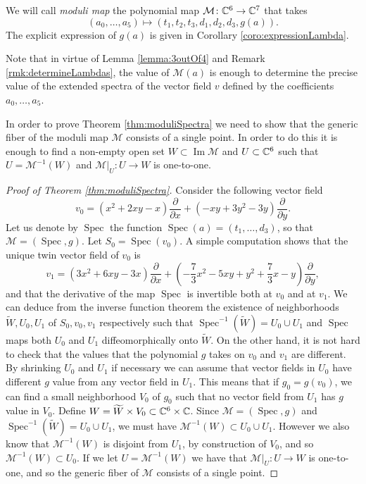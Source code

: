 \documentclass[phd,tocprelim]{cornell}
\begin{document}
\begin{definition}\label{def:moduliMap}
We will call \textit{moduli map} the polynomial map $\mathcal{M}\colon\mathbb{C}^6\to\mathbb{C}^7$ that takes 
\[ (a_0,\ldots,a_5)\longmapsto (t_1,t_2,t_3,d_1,d_2,d_3,g(a)).  \]
The explicit expression of $g(a)$ is given in Corollary \ref{coro:expressionLambda}.
\end{definition}

Note that in virtue of Lemma \ref{lemma:3outOf4} and Remark \ref{rmk:determineLambdas}, the value of $\mathcal{M}(a)$ is enough to determine the precise value of the extended spectra of the vector field $v$ defined by the coefficients $a_0,\ldots,a_5$.

In order to prove Theorem \ref{thm:moduliSpectra} we need to show that the generic fiber of the moduli map $\mathcal{M}$ consists of a single point. In order to do this it is enough to find a non-empty open set $W\subset\operatorname{Im }\mathcal{M}$ and $U\subset\mathbb{C}^6$ such that $U=\mathcal{M}^{-1}(W)$ and $\mathcal{M}\vert_{U}\colon U\to W$ is one-to-one.

\begin{proof}[Proof of Theorem \ref*{thm:moduliSpectra}]
Consider the following vector field
\[ v_0 = (x^2+2xy-x)\frac{\partial}{\partial x}+(-xy+3y^2-3y)\frac{\partial}{\partial y}. \]
Let us denote by $\operatorname{Spec}$ the function $\operatorname{Spec}(a)=(t_1,\ldots,d_3)$, so that $\mathcal{M}=(\operatorname{Spec},g)$. Let $S_0=\operatorname{Spec}(v_0)$. A simple computation shows that the unique twin vector field of $v_0$ is
\[ v_1 = (3x^2+6xy-3x)\frac{\partial}{\partial x}+\left(-\frac{7}{3}x^2-5xy+y^2+\frac{7}{3}x-y\right)\frac{\partial}{\partial y}, \]
and that the derivative of the map $\operatorname{Spec}$ is invertible both at $v_0$ and at $v_1$. We can deduce from the inverse function theorem the existence of neighborhoods $\widetilde{W}, U_0, U_1$ of $S_0,v_0,v_1$ respectively such that $\operatorname{Spec}^{-1}(\widetilde{W})= U_0\cup U_1$ and $\operatorname{Spec}$ maps both $ U_0$ and $ U_1$ diffeomorphically onto $\widetilde{W}$. On the other hand, it is not hard to check that the values that the polynomial $g$ takes on $v_0$ and $v_1$ are different. By shrinking $ U_0$ and $ U_1$ if necessary we can assume that vector fields in $ U_0$ have different $g$ value from any vector field in $ U_1$. This means that if $g_0=g(v_0)$, we can find a small neighborhood $V_0$ of $g_0$ such that no vector field from $ U_1$ has $g$ value in $V_0$. Define $W=\widetilde{W}\times V_0\subset\mathbb{C}^6\times\mathbb{C}$. Since $\mathcal{M}=(\operatorname{Spec},g)$ and $\operatorname{Spec}^{-1}(\widetilde{W})= U_0\cup U_1$, we must have $\mathcal{M}^{-1}(W)\subset  U_0\cup U_1$. However we also know that $\mathcal{M}^{-1}(W)$ is disjoint from $ U_1$, by construction of $V_0$, and so $\mathcal{M}^{-1}(W)\subset U_0$. If we let $U=\mathcal{M}^{-1}(W)$ we have that $\mathcal{M}\vert_{U}\colon U\to W$ is one-to-one, and so the generic fiber of $\mathcal{M}$ consists of a single point.
\end{proof}
\end{document}
